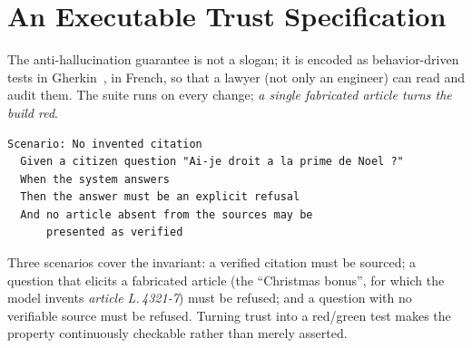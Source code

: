 \section{An Executable Trust Specification}
\label{sec:bdd}
The anti-hallucination guarantee is not a slogan; it is encoded as
behavior-driven tests in Gherkin~\cite{gherkin}, in French, so that a lawyer
(not only an engineer) can read and audit them. The suite runs on every
change; \emph{a single fabricated article turns the build red}.

\begin{lstlisting}[style=lr]
Scenario: No invented citation
  Given a citizen question "Ai-je droit a la prime de Noel ?"
  When the system answers
  Then the answer must be an explicit refusal
  And no article absent from the sources may be
      presented as verified
\end{lstlisting}

Three scenarios cover the invariant: a verified citation must be sourced; a
question that elicits a fabricated article (the ``Christmas bonus'', for which
the model invents \emph{article L.\,4321-7}) must be refused; and a question
with no verifiable source must be refused. Turning trust into a red/green test
makes the property continuously checkable rather than merely asserted.
